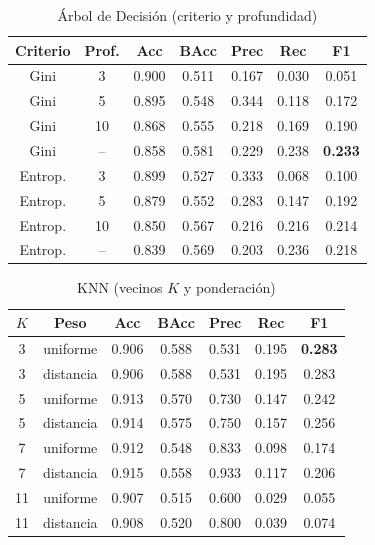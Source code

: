\documentclass[conference]{IEEEtran}
\begin{document}
\begin{table}[t]
\caption{\'Arbol de Decisi\'on (criterio y profundidad)}
\label{tab:dt}
\centering\footnotesize
\begin{tabular}{ccccccc}
\hline
Criterio & Prof. & Acc & BAcc & Prec & Rec & F1 \\
\hline
Gini    & 3    & 0.900 & 0.511 & 0.167 & 0.030 & 0.051 \\
Gini    & 5    & 0.895 & 0.548 & 0.344 & 0.118 & 0.172 \\
Gini    & 10   & 0.868 & 0.555 & 0.218 & 0.169 & 0.190 \\
Gini    & --   & 0.858 & 0.581 & 0.229 & 0.238 & \textbf{0.233} \\
Entrop. & 3    & 0.899 & 0.527 & 0.333 & 0.068 & 0.100 \\
Entrop. & 5    & 0.879 & 0.552 & 0.283 & 0.147 & 0.192 \\
Entrop. & 10   & 0.850 & 0.567 & 0.216 & 0.216 & 0.214 \\
Entrop. & --   & 0.839 & 0.569 & 0.203 & 0.236 & 0.218 \\
\hline
\end{tabular}
\end{table}

\begin{table}[t]
\caption{KNN (vecinos $K$ y ponderaci\'on)}
\label{tab:knn}
\centering\footnotesize
\begin{tabular}{ccccccc}
\hline
$K$ & Peso & Acc & BAcc & Prec & Rec & F1 \\
\hline
3  & uniforme  & 0.906 & 0.588 & 0.531 & 0.195 & \textbf{0.283} \\
3  & distancia & 0.906 & 0.588 & 0.531 & 0.195 & 0.283 \\
5  & uniforme  & 0.913 & 0.570 & 0.730 & 0.147 & 0.242 \\
5  & distancia & 0.914 & 0.575 & 0.750 & 0.157 & 0.256 \\
7  & uniforme  & 0.912 & 0.548 & 0.833 & 0.098 & 0.174 \\
7  & distancia & 0.915 & 0.558 & 0.933 & 0.117 & 0.206 \\
11 & uniforme  & 0.907 & 0.515 & 0.600 & 0.029 & 0.055 \\
11 & distancia & 0.908 & 0.520 & 0.800 & 0.039 & 0.074 \\
\hline
\end{tabular}
\end{table}
\end{document}
